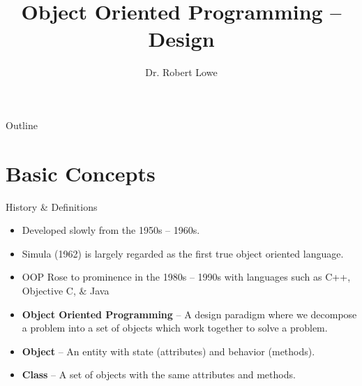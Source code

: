 \documentclass[]{beamer}
\title{Object Oriented Programming -- Design}
\author{Dr. Robert Lowe\\}
\institute[Maryville College] %
{
  Division of Mathematics and Computer Science\\
  Maryville College
}
\date[]{}
\begin{document}
\begin{frame}
  \titlepage
\end{frame}

\begin{frame}{Outline}
  \tableofcontents
\end{frame}





\section{Basic Concepts}
\begin{frame}{History \& Definitions}
    \begin{itemize}[<+(1)->]
        \item Developed slowly from the 1950s -- 1960s.
        \item Simula (1962) is largely regarded as the first true object
            oriented language. 
        \item OOP Rose to prominence in the 1980s -- 1990s with
            languages such as C++, Objective C, \& Java
        \item \textbf{Object Oriented Programming} -- A design
            paradigm where we decompose a problem into a set of
            objects which work together to solve a problem.
        \item \textbf{Object} -- An entity with state (attributes) and
            behavior (methods).
        \item \textbf{Class} -- A set of objects with the same
            attributes and methods.
    \end{itemize}
\end{frame}
\end{document}
